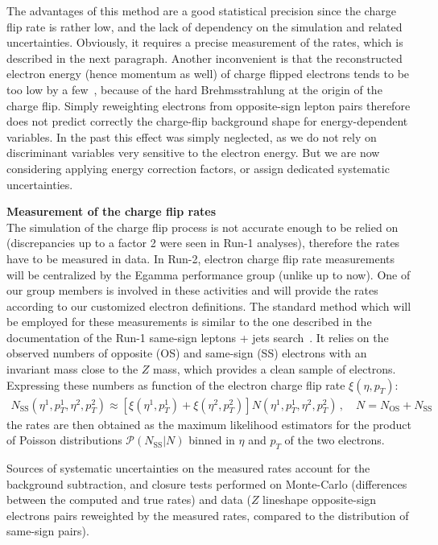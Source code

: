 The advantages of this method are a good statistical precision since the charge flip rate is rather low, 
and the lack of dependency on the simulation and related uncertainties. 
Obviously, it requires a precise measurement of the rates, which is described in the next paragraph. 
Another inconvenient is that the reconstructed electron energy (hence momentum as well) of charge flipped electrons 
tends to be too low by a few~\GeV, because of the hard Brehmsstrahlung at the origin of the charge flip. 
Simply reweighting electrons from opposite-sign lepton pairs therefore does not predict correctly the charge-flip background shape 
for energy-dependent variables. 
In the past this effect was simply neglected, as we do not rely on discriminant variables very sensitive to the electron energy. 
But we are now considering applying energy correction factors, or assign dedicated systematic uncertainties. 
\\
\par{\bf Measurement of the charge flip rates\\}
The simulation of the charge flip process is not accurate enough to be relied on (discrepancies up to a factor 2 were seen in Run-1 analyses), 
therefore the rates have to be measured in data. 
In Run-2, electron charge flip rate measurements will be centralized by the Egamma performance group (unlike up to now). 
One of our group members is involved in these activities and will provide the rates according to our customized electron definitions. 
The standard method which will be employed for these measurements is similar to the one described 
in the documentation of the Run-1 same-sign leptons + jets search~\cite{noteSS3L}. 
It relies on the observed numbers of opposite (OS) and same-sign (SS) electrons with an invariant mass close to the $Z$ mass, 
which provides a clean sample of electrons. Expressing these numbers as function of the electron charge flip rate $\xi(\eta,p_T)$: 
\begin{align}
N_\text{SS}\left(\eta^{1},p_T^{1},\eta^{2},p_T^{2}\right) \approx 
\left[\xi\left(\eta^{1},p_T^{1}\right) + \xi\left(\eta^{2},p_T^{2}\right)\right] 
N\left(\eta^{1},p_T^{1},\eta^{2},p_T^{2}\right)\,,\quad N=N_\text{OS}+N_\text{SS}
\end{align}
the rates are then obtained as the maximum likelihood estimators for the product of Poisson distributions $\mathcal{P}(N_\text{SS}| N)$ 
binned in $\eta$ and $p_T$ of the two electrons. 

Sources of systematic uncertainties on the measured rates account for the background subtraction, 
and closure tests performed on Monte-Carlo (differences between the computed and true rates) 
and data ($Z$ lineshape opposite-sign electrons pairs reweighted by the measured rates, compared to the distribution of same-sign pairs). 

